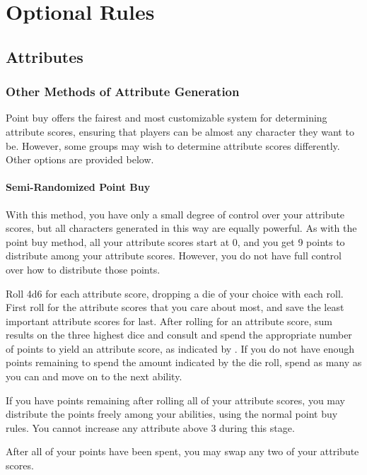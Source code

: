 \chapter{Optional Rules}

\section{Attributes}

    \subsection{Other Methods of Attribute Generation}
        Point buy offers the fairest and most customizable system for determining attribute scores, ensuring that players can be almost any character they want to be. However, some groups may wish to determine attribute scores differently. Other options are provided below.

        \subsubsection{Semi-Randomized Point Buy}
            With this method, you have only a small degree of control over your attribute scores, but all characters generated in this way are equally powerful.
            As with the point buy method, all your attribute scores start at 0, and you get 9 points to distribute among your attribute scores.
            However, you do not have full control over how to distribute those points.

            Roll 4d6 for each attribute score, dropping a die of your choice with each roll. First roll for the attribute scores that you care about most, and save the least important attribute scores for last. After rolling for an attribute score, sum results on the three highest dice and consult  and spend the appropriate number of points to yield an attribute score, as indicated by . If you do not have enough points remaining to spend the amount indicated by the die roll, spend as many as you can and move on to the next ability.

            If you have points remaining after rolling all of your attribute scores, you may distribute the points freely among your abilities, using the normal point buy rules. You cannot increase any attribute above 3 during this stage.

            After all of your points have been spent, you may swap any two of your attribute scores.

